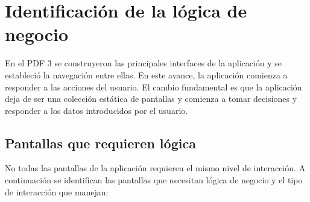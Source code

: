 
\section{Identificaci\'on de la l\'ogica de negocio}

En el PDF 3 se construyeron las principales interfaces de la aplicaci\'on y se
estableci\'o la navegaci\'on entre ellas. En este avance, la aplicaci\'on comienza
a responder a las acciones del usuario. El cambio fundamental es que la
aplicaci\'on deja de ser una colecci\'on est\'atica de pantallas y comienza a tomar
decisiones y responder a los datos introducidos por el usuario.

\subsection{Pantallas que requieren l\'ogica}

No todas las pantallas de la aplicaci\'on requieren el mismo nivel de
interacci\'on. A continuaci\'on se identifican las pantallas que necesitan
l\'ogica de negocio y el tipo de interacci\'on que manejan:

\begin{table}[H]
  \centering
  \caption{Pantallas con l\'ogica de negocio}
\end{table}

